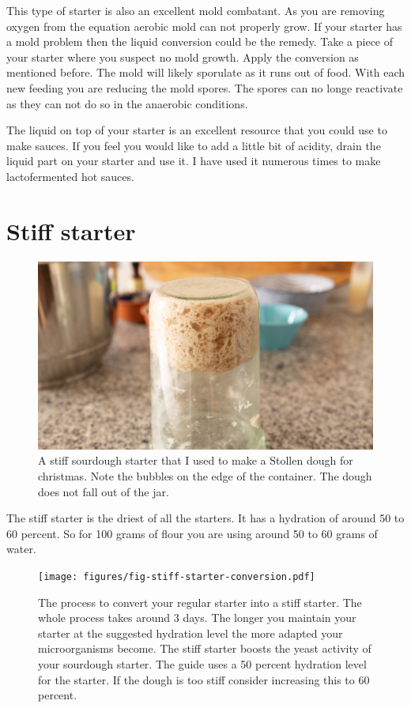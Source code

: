 This type of starter is also an excellent mold combatant. As you are removing
oxygen from the equation aerobic mold can not properly grow. If your starter
has a mold problem then the liquid conversion could be the remedy. Take a
piece of your starter where you suspect no mold growth. Apply the conversion
as mentioned before. The mold will likely sporulate as it runs out of food.
With each new feeding you are reducing the mold spores. The spores can no
longe reactivate as they can not do so in the anaerobic conditions.

The liquid on top of your starter is an excellent resource that you could use
to make sauces. If you feel you would like to add a little bit of acidity,
drain the liquid part on your starter and use it. I have used it numerous
times to make lactofermented hot sauces.

\section{Stiff starter}
\label{section:stiff-starter}

\begin{figure}[!htb]
  \includegraphics[width=\textwidth]{sourdough-starter-stiff.jpg}
  \caption{A stiff sourdough starter that I used to make a Stollen dough for christmas. Note
  the bubbles on the edge of the container. The dough does not fall out of the jar.}
  \label{fig:stiff-sourdough-starter}
\end{figure}

The stiff starter is the driest of all the starters. It has a hydration of
around 50 to 60 percent. So for 100 grams of flour you are using around 50 to
60 grams of water.

\begin{figure}[!htb]
  \texttt{[image: figures/fig-stiff-starter-conversion.pdf]}
  \caption{The process to convert your regular starter into a stiff starter. The whole
  process takes around 3 days. The longer you maintain your starter at the
  suggested hydration level the more adapted your microorganisms become. The
  stiff starter boosts the yeast activity of your sourdough starter.
  The guide uses a 50 percent hydration level for the starter. If the dough is too stiff
  consider increasing this to 60 percent.}
  \label{fig:stiff-starter-conversion}
\end{figure}

